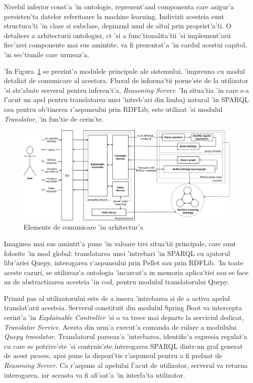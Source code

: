 \documentclass[12pt,a4paper,twoside]{report}
\begin{document}
Nivelul inferior const'a 'in ontologie, reprezent'and componenta care asigur'a persisten'ta datelor referitoare la machine learning. Indivizii acesteia sunt structura'ti 'in clase si subclase, depinz\ia nd unul de altul prin propriet'a'ti. O detaliere a arhitecturii ontologiei, c\ia t 'si a func'tionalita'tii 'si implement'arii fiec'arei componente mai sus amintite, va fi prezentat'a 'in cardul acestui capitol, 'in sec'tiunile care urmeaz'a. 

'In Figura~\ref{fig:arch_det} se prezint'a modulele principale ale sistemului, 'impreuna cu modul detaliat de comunicare al acestora. Fluxul de informa'tii porne'ste de la utilizator 'si str'abate serverul pentru inferen't'a, {\it Reasoning Server}. 'In situa'tia 'in care s-a f'acut un apel pentru translatarea unei 'intreb'ari din limbaj natural 'in SPARQL sau pentru ob'tinerea r'aspunsului prin RDFLib, este utilizat 'si modulul {\it Translator}, 'in fun'tie de cerin'te. 

\begin{figure}
    \centering
    \includegraphics[width = 0.9\linewidth]{img/architecture_details.png}
        \caption{Elemente de comunicare 'in arhitectur'a}
    \label{fig:arch_det}
\end{figure}

Imaginea mai sus amintit'a pune 'in valoare trei situa'tii principale, care sunt folosite 'in mod global: translatarea unei 'intrebari 'in SPARQL cu ajutorul libr'ariei Quepy, interogarea r'aspunsului prin Pellet sau prin RDFLib. 'In toate aceste cazuri, se utilizeaz'a ontologia 'incarcat'a in memoria aplica'tiei sau se face uz de abstractizarea acesteia 'in cod, pentru modulul translatorului Quepy.

Primul pas al utilizatorului este de a insera 'intrebarea si de a activa apelul translat'arii acesteia. Serverul constituit din modulul Spring Boot va intercepta cerint'a 'in {\it Explainable Controller} 'si o va trece mai departe la serviciul dedicat, {\it Translator Service}. Acesta din urm'a execut'a comanda de rulare a modulului {\it Quepy translator}. Translatorul parseaz'a 'intrebarea, identific'a expresia regulat'a cu care se potrive'ste 'si contruie'ste interogarea SPARQL dintr-un graf generat de acest proces, apoi pune la dispozi'tie r'aspunsul pentru a fi preluat de {\it Reasoning Server}. Ca r'aspuns al apelului f'acut de utilizator, serverul va returna interogarea, iar aceasta va fi afi'sat'a 'in interfa'ta utilizator.
\end{document}
